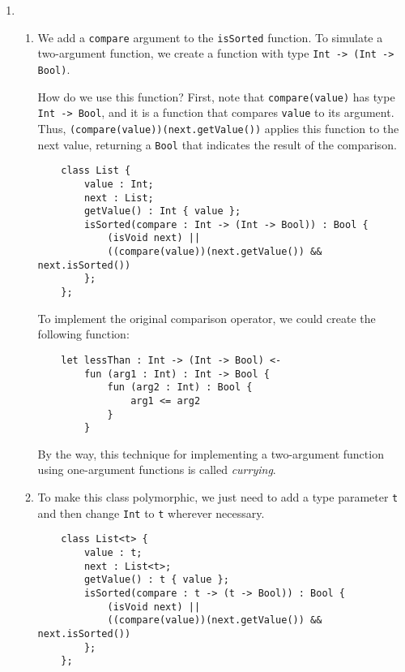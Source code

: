 \documentclass{article}
\begin{document}
\begin{enumerate}
\medskip

\item

\begin{enumerate}

\item

We add a \texttt{compare} argument to the \texttt{isSorted} function.  To
simulate a two-argument function, we create a function with type
\texttt{Int -> (Int -> Bool)}.

How do we use this function?  First, note that \texttt{compare(value)} has
type \texttt{Int -> Bool}, and it is a function that compares
\texttt{value} to its argument.  Thus,
\texttt{(compare(value))(next.getValue())} applies this function to the
next value, returning a \texttt{Bool} that indicates the result of the
comparison.

\begin{verbatim}
    class List {
        value : Int;
        next : List;
        getValue() : Int { value };
        isSorted(compare : Int -> (Int -> Bool)) : Bool {
            (isVoid next) ||
            ((compare(value))(next.getValue()) && next.isSorted())
        };
    };
\end{verbatim}

To implement the original comparison operator, we could create the
following function:

\begin{verbatim}
    let lessThan : Int -> (Int -> Bool) <-
        fun (arg1 : Int) : Int -> Bool {
            fun (arg2 : Int) : Bool {
                arg1 <= arg2
            }
        }
\end{verbatim}

By the way, this technique for implementing a two-argument function using
one-argument functions is called {\em currying}.

\item

To make this class polymorphic, we just need to add a type parameter
\texttt{t} and then change \texttt{Int} to \texttt{t} wherever necessary.

\begin{verbatim}
    class List<t> {
        value : t;
        next : List<t>;
        getValue() : t { value };
        isSorted(compare : t -> (t -> Bool)) : Bool {
            (isVoid next) ||
            ((compare(value))(next.getValue()) && next.isSorted())
        };
    };
\end{verbatim}


\end{enumerate}
\end{enumerate}
\end{document}

